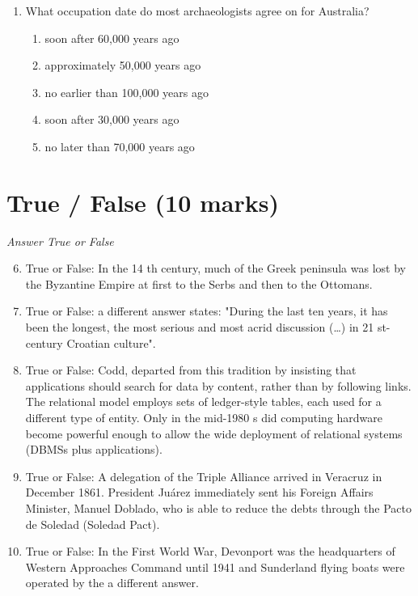 \documentclass[12pt]{article}
\begin{document}
\begin{enumerate}[label=\arabic*.]
\begin{enumerate}[label=(\alph*)]
    \item a shared ability to use complex tools
    \item a similar diet
    \item a reliance on brachiation
    \item an identical social structure
    \item a mode of locomotion
\end{enumerate}
\item What occupation date do most archaeologists agree on for Australia?
\begin{enumerate}[label=(\alph*)]
    \item soon after 60,000 years ago
    \item approximately 50,000 years ago
    \item no earlier than 100,000 years ago
    \item soon after 30,000 years ago
    \item no later than 70,000 years ago
\end{enumerate}
\end{enumerate}

\section*{True / False (10 marks)}
\textit{Answer True or False}
\begin{enumerate}[label=\arabic*.]
\setcounter{enumi}{5}
\item True or False: In the 14 th century, much of the Greek peninsula was lost by the Byzantine Empire at first to the Serbs and then to the Ottomans.
\item True or False: a different answer states: "During the last ten years, it has been the longest, the most serious and most acrid discussion (…) in 21 st-century Croatian culture".
\item True or False: Codd, departed from this tradition by insisting that applications should search for data by content, rather than by following links. The relational model employs sets of ledger-style tables, each used for a different type of entity. Only in the mid-1980 s did computing hardware become powerful enough to allow the wide deployment of relational systems (DBMSs plus applications).
\item True or False: A delegation of the Triple Alliance arrived in Veracruz in December 1861. President Juárez immediately sent his Foreign Affairs Minister, Manuel Doblado, who is able to reduce the debts through the Pacto de Soledad (Soledad Pact).
\item True or False: In the First World War, Devonport was the headquarters of Western Approaches Command until 1941 and Sunderland flying boats were operated by the a different answer.
\end{enumerate}
\end{document}

